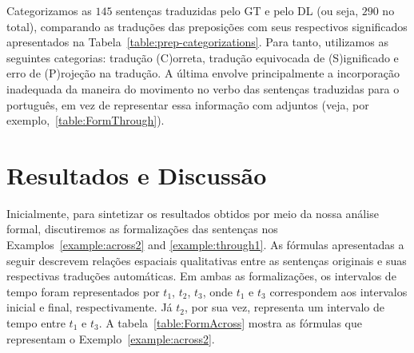 \documentclass[a4paper, twocolumn, 11pt, twoside]{article}
\begin{document}
Categorizamos as $145$ sentenças traduzidas pelo GT e pelo DL (ou seja, $290$ no total), comparando as traduções das preposições  
com seus respectivos significados apresentados na Tabela~\ref{table:prep-categorizations}. Para tanto, utilizamos 
as seguintes categorias: tradução (C)orreta, tradução equivocada de (S)ignificado e erro de (P)rojeção na tradução. 
A última envolve principalmente a incorporação inadequada da maneira do movimento no verbo das sentenças traduzidas para o português, em vez de representar essa informação com adjuntos (veja, por exemplo,~\ref{table:FormThrough}).

\section{Resultados e Discussão}
Inicialmente, para sintetizar os resultados obtidos por meio da nossa análise formal, discutiremos as
formalizações das sentenças nos Examplos~\ref{example:across2} and \ref{example:through1}.  As fórmulas apresentadas a seguir descrevem relações espaciais qualitativas 
entre as sentenças originais e suas respectivas traduções automáticas.
Em ambas as formalizações, os intervalos de tempo foram representados por $t_1$, $t_2$, $t_3$, onde $t_1$ e $t_3$ correspondem aos intervalos inicial e final, respectivamente. 
Já $t_2$, por sua vez,  representa um intervalo de tempo entre $t_1$ e $t_3$.
A tabela~\ref{table:FormAcross} mostra as fórmulas que representam o Exemplo~\ref{example:across2}.
\end{document}
